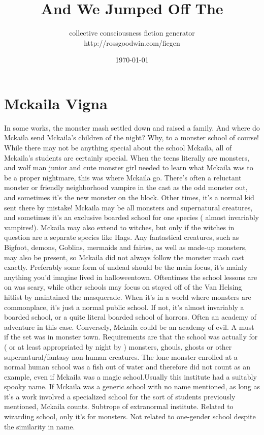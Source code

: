 \documentclass[12pt]{book}
\title{And We Jumped Off The}
\author{collective consciousness fiction generator\\http://rossgoodwin.com/ficgen}
\date{\today}
\begin{document}
\maketitle



\chapter{Mckaila Vigna}

In some works, the monster mash settled down and raised a family. And where do Mckaila send Mckaila's children of the night? Why, to a monster school of course! While there may not be anything special about the school Mckaila, all of Mckaila's students are certainly special. When the teens literally are monsters, and wolf man junior and cute monster girl needed to learn what Mckaila was to be a proper nightmare, this was where Mckaila go. There's often a reluctant monster or friendly neighborhood vampire in the cast as the odd monster out, and sometimes it's the new monster on the block. Other times, it's a normal kid sent there by mistake! Mckaila may be all monsters and supernatural creatures, and sometimes it's an exclusive boarded school for one species ( almost invariably vampires!). Mckaila may also extend to witches, but only if the witches in question are a separate species like Hags. Any fantastical creatures, such as Bigfoot, demons, Goblins, mermaids and fairies, as well as made-up monsters, may also be present, so Mckaila did not always follow the monster mash cast exactly. Preferably some form of undead should be the main focus, it's mainly anything you'd imagine lived in halloweentown. Oftentimes the school lessons are on was scary, while other schools may focus on stayed off of the Van Helsing hitlist by maintained the masquerade. When it's in a world where monsters are commonplace, it's just a normal public school. If not, it's almost invariably a boarded school, or a quite literal boarded school of horrors. Often an academy of adventure in this case. Conversely, Mckaila could be an academy of evil. A must if the set was in monster town. Requirements are that the school was actually for ( or at least appropriated by night by ) monsters, ghouls, ghosts or other supernatural/fantasy non-human creatures. The lone monster enrolled at a normal human school was a fish out of water and therefore did not count as an example, even if Mckaila was a magic school.Usually this institute had a suitably spooky name. If Mckaila was a generic school with no name mentioned, as long as it's a work involved a specialized school for the sort of students previously mentioned, Mckaila counts. Subtrope of extranormal institute. Related to wizarding school, only it's for monsters. Not related to one-gender school despite the similarity in name.
\end{document}
